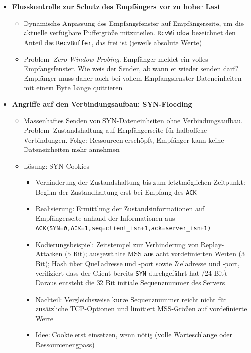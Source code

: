 \begin{itemize}
\begin{itemize}
\begin{minipage}{\linewidth}
			\end{minipage}
	\end{itemize}
	\item \textbf{Flusskontrolle zur Schutz des Empfängers vor zu hoher Last}
	\begin{itemize}
		\item Dynamische Anpassung des Empfangsfenster auf Empfängerseite, um die aktuelle verfügbare Puffergröße mitzuteilen. \texttt{RcvWindow} bezeichnet den Anteil des \texttt{RecvBuffer}, das frei ist (jeweils absolute Werte)
		\item Problem: \textit{Zero Window Probing}. Empfänger meldet ein volles Empfangsfenster. Wie weis der Sender, ab wann er wieder senden darf? Empfänger muss daher auch bei vollem Empfangsfenster Dateneinheiten mit einem Byte Länge quittieren
	\end{itemize}
	\item \textbf{Angriffe auf den Verbindungsaufbau: SYN-Flooding}
	\begin{itemize}
		\item Massenhaftes Senden von SYN-Dateneinheiten ohne Verbindungsaufbau. Problem: Zustandshaltung auf Empfängerseite für halboffene Verbindungen. Folge: Ressourcen erschöpft, Empfänger kann keine Dateneinheiten mehr annehmen
		\item Lösung: SYN-Cookies
		\begin{itemize}
			\item Verhinderung der Zustandshaltung bis zum letztmöglichen Zeitpunkt: Beginn der Zustandhaltung erst bei Empfang des \texttt{ACK}
			\item Realisierung: Ermittlung der Zustandsinformationen auf Empfängerseite anhand der Informationen aus \texttt{ACK(SYN=0,ACK=1,seq=client\_isn+1,ack=server\_isn+1)}
			\item Kodierungsbeispiel: Zeitstempel zur Verhinderung von Replay-Attacken (5 Bit); ausgewählte MSS aus acht vordefinierten Werten (3 Bit); Hash über Quelladresse und -port sowie Zieladresse und -port, verifiziert dass der Client bereits \texttt{SYN} durchgeführt hat /24 Bit). Daraus entsteht die 32 Bit initiale Sequenznummer des Servers
			\item Nachteil: Vergleichsweise kurze Sequenznummer reicht nicht für zusätzliche TCP-Optionen und limitiert MSS-Größen auf vordefinierte Werte
			\item Idee: Cookie erst einsetzen, wenn nötig (volle Warteschlange oder Ressourcenengpass)
		\end{itemize}
	\end{itemize}
\end{itemize}

